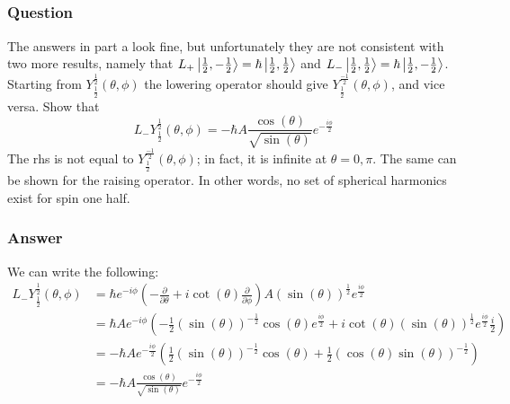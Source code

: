 \documentclass[12pt]{article}
\begin{document}
\subsection{}
\subsubsection{Question}
The answers in part a look fine, but unfortunately they are not consistent with two more results, namely that $L_+ \ket{\frac{1}{2},-\frac{1}{2}} = \hbar \ket{\frac{1}{2},\frac{1}{2}}$ and $L_- \ket{\frac{1}{2},\frac{1}{2}} = \hbar \ket{\frac{1}{2},-\frac{1}{2}}$. Starting from $Y_{\frac{1}{2}}^{\frac{1}{2}}(\theta,\phi)$ the lowering operator should give $Y_{\frac{1}{2}}^{\frac{-1}{2}}(\theta,\phi)$, and vice versa. Show that
\begin{equation}
    L_- Y_{\frac{1}{2}}^{\frac{1}{2}}(\theta,\phi) = - \hbar A \frac{\cos(\theta )}{\sqrt{\sin(\theta)}}e^{-\frac{i\phi}{2}}
\end{equation}
The rhs is not equal to $Y_{\frac{1}{2}}^{\frac{-1}{2}}(\theta,\phi)$; in fact, it is infinite at $\theta = 0,\pi $. The same can be shown for the raising operator. In other words, no set of spherical harmonics exist for spin one half.
\subsubsection{Answer}
We can write the following:
\begin{align*}
    L_- Y_{\frac{1}{2}}^{\frac{1}{2}}(\theta,\phi) &= \hbar e^{-i\phi}(-\frac{\partial}{\partial \theta} + i\cot(\theta)\frac{\partial}{\partial \phi})A (\sin(\theta))^{\frac{1}{2}}e^{\frac{i\phi}{2}}\\
    &= \hbar A e^{-i\phi} (-\frac{1}{2}(\sin(\theta))^{-\frac{1}{2}}\cos(\theta)e^{\frac{i\phi}{2}} + i\cot(\theta)(\sin(\theta))^{\frac{1}{2}}e^{\frac{i\phi}{2}}\frac{i}{2})\\
    &= -\hbar A e^{-\frac{i \phi}{2}} (\frac{1}{2}(\sin(\theta))^{-\frac{1}{2}}\cos(\theta) + \frac{1}{2}(\cos(\theta )\sin(\theta))^{-\frac{1}{2}})\\
    &= -\hbar A \frac{\cos(\theta )}{\sqrt{\sin(\theta)}}e^{-\frac{i\phi}{2}}
\end{align*}
\end{document}
